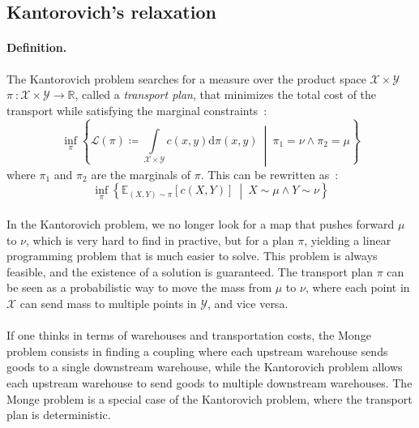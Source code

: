 \documentclass[a4paper,11pt]{article}
\newcommand{\R}{\mathbb{R}}
\newcommand{\E}{\mathbb{E}}
\newcommand{\1}{\mathbbm{1}}
\begin{document}
\subsection{Kantorovich's relaxation}
\label{sec:kantorovich}

\paragraph{Definition.}The Kantorovich problem searches for a measure over the product space $\mathcal{X} \times \mathcal{Y}$ $\pi~: \mathcal{X} \times \mathcal{Y} \rightarrow \R$, called a \emph{transport plan}, that minimizes the total cost of the transport while satisfying the marginal constraints~:
\begin{equation}
    \label{eq:kantorovich}
    \inf_{\pi} \left\{\mathcal{L}(\pi) \coloneq \int\limits_{\mathcal{X} \times \mathcal{Y}} c(x, y) \mathrm{d}\pi(x, y)~\middle|~\pi_1 = \nu\land\pi_2 = \mu\right\}
\end{equation}
where $\pi_1$ and $\pi_2$ are the marginals of $\pi$. This can be rewritten as~:
\begin{equation}
    \label{eq:kantorovich_rewritten}
    \inf_{\pi} \left\{\E_{(X, Y) \sim \pi}[c(X, Y)]~\middle|~X \sim \mu \land Y \sim \nu\right\}
\end{equation}

\paragraph{}In the Kantorovich problem, we no longer look for a map that pushes forward $\mu$ to $\nu$, which is very hard to find in practive, but for a plan $\pi$, yielding a linear programming problem that is much easier to solve. This problem is always feasible, and the existence of a solution is guaranteed. The transport plan $\pi$ can be seen as a probabilistic way to move the mass from $\mu$ to $\nu$, where each point in $\mathcal{X}$ can send mass to multiple points in $\mathcal{Y}$, and vice versa.

\paragraph{}If one thinks in terms of warehouses and transportation costs, the Monge problem consists in finding a coupling where each upstream warehouse sends goods to a single downstream warehouse, while the Kantorovich problem allows each upstream warehouse to send goods to multiple downstream warehouses. The Monge problem is a special case of the Kantorovich problem, where the transport plan is deterministic.
\end{document}
